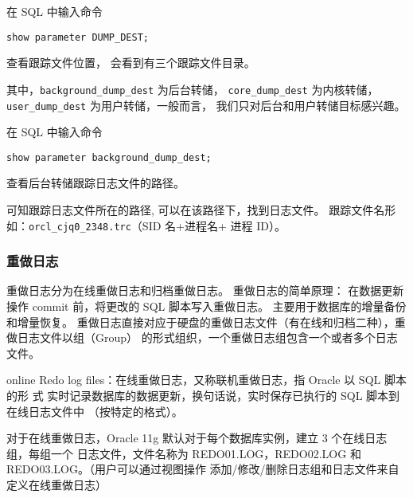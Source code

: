 在 SQL 中输入命令
\begin{verbatim}
show parameter DUMP_DEST;
\end{verbatim}
查看跟踪文件位置，
会看到有三个跟踪文件目录。

其中，\texttt{background\_dump\_dest} 为后台转储，
\texttt{core\_dump\_dest} 为内核转储，
\texttt{user\_dump\_dest} 为用户转储，一般而言，
我们只对后台和用户转储目标感兴趣。

在 SQL 中输入命令
\begin{verbatim}
show parameter background_dump_dest;
\end{verbatim}
查看后台转储跟踪日志文件的路径。

可知跟踪日志文件所在的路径,
可以在该路径下，找到日志文件。
跟踪文件名形如：\texttt{orcl\_cjq0\_2348.trc}（SID 名+进程名+ 进程 ID）。
%
\subsubsection{重做日志}
重做日志分为在线重做日志和归档重做日志。
重做日志的简单原理：
在数据更新操作 commit 前，将更改的 SQL 脚本写入重做日志。
主要用于数据库的增量备份和增量恢复。
重做日志直接对应于硬盘的重做日志文件（有在线和归档二种），重做日志文件以组（Group）
的形式组织，一个重做日志组包含一个或者多个日志文件。

online Redo log files：在线重做日志，又称联机重做日志，指 Oracle 以 SQL 脚本的形
式 实时记录数据库的数据更新，换句话说，实时保存已执行的 SQL 脚本到在线日志文件中
（按特定的格式）。

对于在线重做日志，Oracle 11g 默认对于每个数据库实例，建立 3 个在线日志组，每组一个
日志文件，文件名称为 REDO01.LOG，REDO02.LOG 和 REDO03.LOG。（用户可以通过视图操作
添加/修改/删除日志组和日志文件来自定义在线重做日志）

